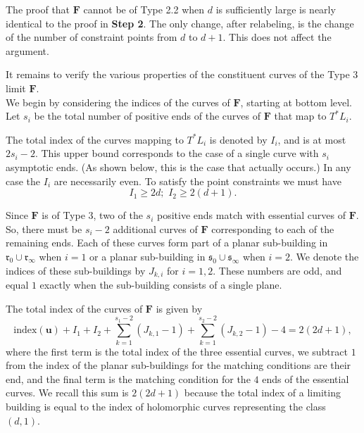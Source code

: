 \documentclass[12pt]{amsart}
\theoremstyle{definition}
\begin{document}
\bigskip


  The proof that $\mathbf{F}$ cannot be of Type 2.2 when $d$ is sufficiently large is nearly identical to the proof in {\bf Step 2}. The only change, after relabeling, is the change of the number of constraint points from $d$ to $d+1$.  This does not affect the argument.

\bigskip


  It remains to verify the various properties of the constituent curves of the Type 3 limit $\mathbf{F}$.\\

 We begin by considering the indices of the curves of $\mathbf{F}$, starting at bottom level. Let $s_i$ be the total number of positive ends of the curves of $\mathbf{F}$ that map to $T^*L_i$. 


The total index of the curves mapping to $T^*L_i$ is denoted by $I_i$, and is at most $2s_i -2$. This upper bound corresponds to the case of a single curve with $s_i$ asymptotic ends. (As shown below, this is the case that actually occurs.) In any case the $I_i$ are necessarily even. To satisfy the point constraints we must have
\begin{equation}\label{consrtaint}
I_1 \ge 2d; \, \, I_2 \ge 2(d+1).
\end{equation}


Since $\mathbf{F}$ is of Type 3, two of the $s_i$ positive ends match with essential curves of $\mathbf{F}$. So, there must be $s_i -2$ additional curves of $\mathbf{F}$ corresponding to each of the remaining ends. Each of these curves form part of a planar sub-building in $\mathfrak{r}_0 \cup \mathfrak{r}_\infty$ when $i=1$ or a  planar sub-building in $\mathfrak{s}_0 \cup \mathfrak{s}_\infty$ when $i=2$. We denote the indices of these sub-buildings by $J_{k,i}$ for $i=1,2$. These numbers are odd, and equal $1$ exactly when the sub-building consists of a single plane.

The total index of the curves of $\mathbf{F}$ is given by \begin{equation}\label{eq:indg3}
   \mathrm{index}(\mathbf{u}) + I_1 + I_2 + \sum_{k=1}^{s_1-2} (J_{k,1}-1) + \sum_{k=1}^{s_2-2} (J_{k,2}-1) - 4 = 2(2d+1), 
\end{equation}
where the first term is the total index of the three essential curves, we subtract $1$ from the index of the planar sub-buildings for the matching conditions are their end, and the final term is the matching condition for the $4$ ends of the essential curves. We recall this sum is $2(2d+1)$ because the total index of a limiting building is equal to the index of holomorphic curves representing the class $(d,1)$.
\end{document}
